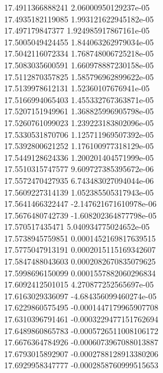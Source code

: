 {17.4911366888241 2.06000950129237e-05 \\
17.4935182119085 1.993121622945182e-05 \\
17.497179847377 1.924985917867161e-05 \\
17.5005049424455 1.844063262979034e-05 \\
17.5042116072334 1.768748006725218e-05 \\
17.5083035600591 1.660978887230158e-05 \\
17.5112870357825 1.585796962899622e-05 \\
17.5139978612131 1.52360107676941e-05 \\
17.5166994065403 1.455332767363871e-05 \\
17.5207151949961 1.368825996905798e-05 \\
17.5260761099023 1.239223183802096e-05 \\
17.5330531870706 1.125711969507392e-05 \\
17.5392800621252 1.176100977318129e-05 \\
17.5449128624336 1.200201404571999e-05 \\
17.5510315747577 9.609727385395672e-06 \\
17.5572470427935 6.743483027094044e-06 \\
17.5609227314139 1.052385505317943e-05 \\
17.5641466322447 -2.147621671610978e-06 \\
17.5676480742739 -1.608202364877798e-05 \\
17.570517435471 5.040934775024652e-05 \\
17.5738945759851 0.0001452169817639515 \\
17.5775047913191 0.0002015115169342607 \\
17.5847488043603 0.0002082670835079625 \\
17.5998696150099 0.0001557882060296834 \\
17.6092412501015 4.270877252565697e-05 \\
17.6163029336097 -4.684356099460274e-05 \\
17.6229860575495 -0.0001447179965907708 \\
17.6310396791461 -0.0003229477151762694 \\
17.6489860865783 -0.0005726511008106172 \\
17.6676364784926 -0.0006073967088013887 \\
17.6793015892907 -0.0002788128913380206 \\
17.6929958347777 -0.0002858760999515653 \\
}
